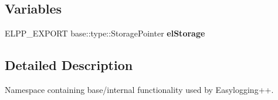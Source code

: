 \subsection*{Variables}
\begin{DoxyCompactItemize}
\item 
\mbox{\label{namespaceel_1_1base_a0ec6b7a1bd89ad58dadc10f190142018}} 
E\+L\+P\+P\+\_\+\+E\+X\+P\+O\+RT base\+::type\+::\+Storage\+Pointer {\bfseries el\+Storage}
\end{DoxyCompactItemize}


\subsection{Detailed Description}
Namespace containing base/internal functionality used by Easylogging++. 